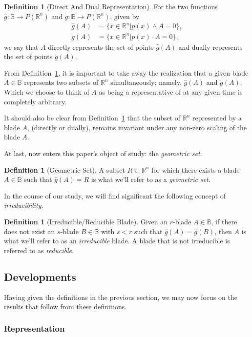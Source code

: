 \documentclass{birkjour}
\theoremstyle{definition}
\newtheorem{defn}[thm]{Definition}
\theoremstyle{remark}
\numberwithin{equation}{section}
\newcommand{\R}{\mathbb{R}}
\newcommand{\B}{\mathbb{B}}
\newcommand{\gd}{\dot{g}}
\newcommand{\gh}{\hat{g}}
\begin{document}
\begin{defn}[Direct And Dual Representation]\label{def_gh_and_gd}
For the two functions $\gh:\B\to P(\R^n)$ and $\gd:\B\to P(\R^n)$, given by
\begin{align}
\gh(A) &= \{x\in\R^n|p(x)\wedge A=0\},\\
\gd(A) &= \{x\in\R^n|p(x)\cdot A=0\},
\end{align}
we say that $A$ directly represents the set of points $\gh(A)$ and
dually represents the set of points $\gd(A)$.
\end{defn}

From Definition~\ref{def_gh_and_gd}, it is important to take away the realization that a given blade $A\in\B$
represents two subsets of $\R^n$ simultaneously; namely, $\gh(A)$ and $\gd(A)$.  Which we choose
to think of $A$ as being a representative of at any given time is completely arbitrary.

It should also be clear from Definition~\ref{def_gh_and_gd} that the subset of $\R^n$ represented by a
blade $A$, (directly or dually), remains invariant under any non-zero scaling of the blade $A$.

At last, now enters this paper's object of study: the {\it geometric set}.

\begin{defn}[Geometric Set]\label{def_geo_set}
A subset $R\subset\R^n$ for which there exists a blade $A\in\B$ such that $\gh(A)=R$ is what
we'll refer to as a {\it geometric set}.
\end{defn}

In the course of our study, we will find significant the following concept of {\it irreducibility}.

\begin{defn}[Irreducible/Reducible Blade]\label{def_irreducible_blade}
Given an $r$-blade $A\in\B$, if there does not exist an $s$-blade $B\in\B$ with $s<r$
such that $\gh(A)=\gh(B)$, then $A$ is what we'll refer to as an {\it irreducible} blade.
A blade that is not irreducible is referred to as {\it reducible}.
\end{defn}

\subsection{Developments}

Having given the definitions in the previous section, we may now focus on the results that follow
from these definitions.

\subsubsection{Representation}
\end{document}
